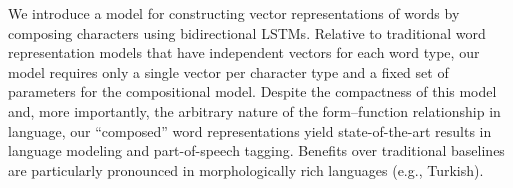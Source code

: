 We introduce a model for constructing vector representations of words by composing characters using bidirectional LSTMs. Relative to traditional word representation models that have independent vectors for each word type, our model requires only a single vector per character type and a fixed set of parameters for the compositional model. Despite the compactness of this model and, more importantly, the arbitrary nature of the form--function relationship in language, our ``composed'' word representations yield state-of-the-art results in language modeling and part-of-speech tagging. Benefits over traditional baselines are particularly pronounced in morphologically rich languages (e.g., Turkish).
